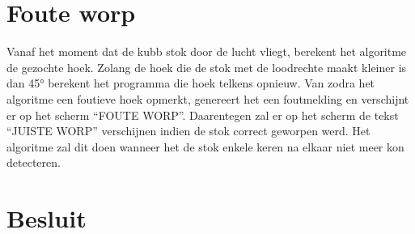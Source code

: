 \documentclass[kulak]{kulakarticle} %
\begin{document}
	\section{Foute worp}
	Vanaf het moment dat de kubb stok door de lucht vliegt, berekent het algoritme de gezochte hoek. Zolang de hoek die de stok met de loodrechte maakt kleiner is dan 45° berekent het programma die hoek telkens opnieuw. Van zodra het algoritme een foutieve hoek opmerkt, genereert het een foutmelding en verschijnt er op het scherm “FOUTE WORP”.  Daarentegen zal er op het scherm de tekst “JUISTE WORP” verschijnen indien de stok correct geworpen werd. Het algoritme zal dit doen wanneer het de stok enkele keren na elkaar niet meer kon detecteren.


	\section*{Besluit}

	
\end{document}
